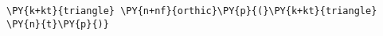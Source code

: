 \begin{Verbatim}[commandchars=\\\{\}]
    \PY{k+kt}{triangle} \PY{n+nf}{orthic}\PY{p}{(}\PY{k+kt}{triangle} \PY{n}{t}\PY{p}{)}
\end{Verbatim}
